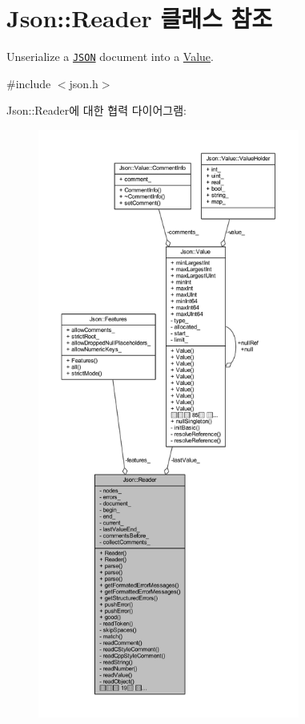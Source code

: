 \hypertarget{class_json_1_1_reader}{}\section{Json\+:\+:Reader 클래스 참조}
\label{class_json_1_1_reader}


Unserialize a \href{http://www.json.org}{\tt J\+S\+ON} document into a \hyperlink{class_json_1_1_value}{Value}.  




{\ttfamily \#include $<$json.\+h$>$}



Json\+:\+:Reader에 대한 협력 다이어그램\+:
\nopagebreak
\begin{figure}[H]
\begin{center}
\leavevmode
\includegraphics[height=550pt]{class_json_1_1_reader__coll__graph}
\end{center}
\end{figure}
